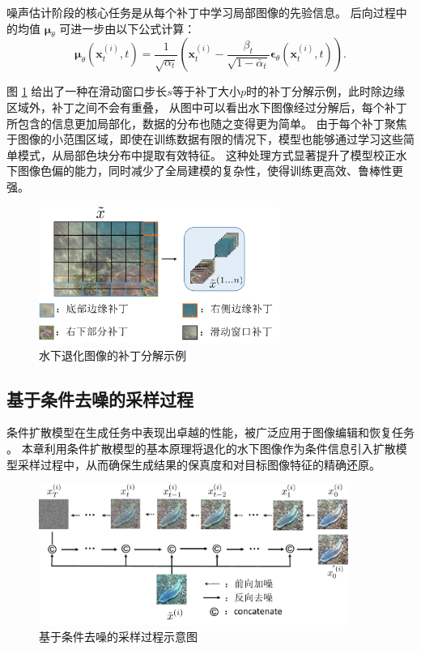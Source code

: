 噪声估计阶段的核心任务是从每个补丁中学习局部图像的先验信息。
后向过程中的均值 $\boldsymbol{\mu}_\theta$ 可进一步由以下公式计算：
\begin{equation}
    \boldsymbol{\mu}_\theta\left(\mathbf{x}^{(i)}_t, t\right)=\frac{1}{\sqrt{\alpha_t}}\left(\mathbf{x}^{(i)}_t-\frac{\beta_t}{\sqrt{1-\bar{\alpha}_t}} \boldsymbol{\epsilon}_\theta\left(\mathbf{x}^{(i)}_t, t\right)\right).
\end{equation}

图 \ref{img:patch} 给出了一种在滑动窗口步长$s$等于补丁大小$p$时的补丁分解示例，此时除边缘区域外，补丁之间不会有重叠，
从图中可以看出水下图像经过分解后，每个补丁所包含的信息更加局部化，数据的分布也随之变得更为简单。
由于每个补丁聚焦于图像的小范围区域，即使在训练数据有限的情况下，模型也能够通过学习这些简单模式，从局部色块分布中提取有效特征。
这种处理方式显著提升了模型校正水下图像色偏的能力，同时减少了全局建模的复杂性，使得训练更高效、鲁棒性更强。
\begin{figure}
    \vspace{4mm}
    \centering
    \includegraphics[width=0.7\textwidth]{figures/ch3/patch.pdf}
    \caption{水下退化图像的补丁分解示例}
    \label{img:patch}
\end{figure}


\subsection{基于条件去噪的采样过程}

条件扩散模型在生成任务中表现出卓越的性能，被广泛应用于图像编辑和恢复任务\cite{cDDPM} \cite{rst_DDPM}。
本章利用条件扩散模型的基本原理将退化的水下图像作为条件信息引入扩散模型采样过程中，从而确保生成结果的保真度和对目标图像特征的精确还原。
\begin{figure}
    \centering
    \includegraphics[width=0.9\textwidth]{figures/ch3/cond_ddpm.pdf}
    \caption{基于条件去噪的采样过程示意图}
    \label{img:cond_ddpm}
\end{figure}

